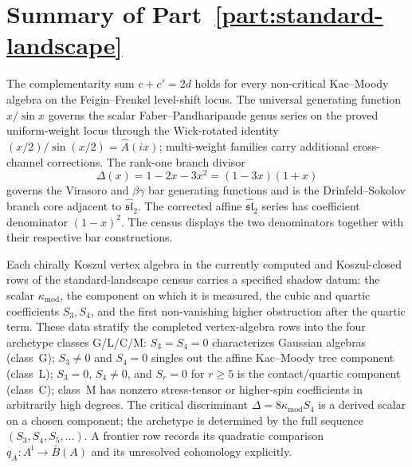 \chapter*{Summary of Part~\ref{part:standard-landscape}}
\label{ch:landscape-census}\label{chap:landscape-census}

\providecommand{\kappaChHodge}{\kappa^{\mathrm{Hodge}}_{\mathrm{ch}}}
\providecommand{\kappaBKM}{\kappa_{\mathrm{BKM}}}

The complementarity sum $c + c' = 2d$ holds for every non-critical
Kac--Moody algebra on the Feigin--Frenkel level-shift locus. The
universal generating function $x/\sin x$ governs the scalar
Faber--Pandharipande genus series on the proved uniform-weight locus
through the Wick-rotated identity
$(x/2)/\sin(x/2)=\widehat{A}(ix)$; multi-weight families carry
additional cross-channel corrections. The rank-one branch divisor
\[
\Delta(x) = 1 - 2x - 3x^2=(1-3x)(1+x)
\]
governs the Virasoro and $\beta\gamma$ bar generating functions and is
the Drinfeld--Sokolov branch core adjacent to
$\widehat{\mathfrak{sl}}_2$.  The corrected affine
$\widehat{\mathfrak{sl}}_2$ series has coefficient denominator
$(1-x)^2$.  The census displays the two denominators together with
their respective bar constructions.

Each chirally Koszul vertex algebra in the currently computed and
Koszul-closed rows of the standard-landscape census carries a specified
shadow datum: the scalar $\kappa_{\mathrm{mod}}$, the component on which it is measured,
the cubic and quartic coefficients $S_3,S_4$, and the first
non-vanishing higher obstruction after the quartic term. These data
stratify the completed vertex-algebra rows into the four archetype
classes G/L/C/M: $S_3=S_4=0$ characterizes Gaussian algebras
(class~G); $S_3\ne0$ and $S_4=0$ singles out the affine
Kac--Moody tree component (class~L); $S_3=0$, $S_4\ne0$, and
$S_r=0$ for $r\ge5$ is the contact/quartic component
(class~C); class~M has nonzero stress-tensor or higher-spin
coefficients in arbitrarily high degrees.  The critical discriminant
$\Delta=8\kappa_{\mathrm{mod}} S_4$ is a derived scalar on a chosen component; the
archetype is determined by the full sequence
\((S_3,S_4,S_5,\ldots)\).  A frontier row records its quadratic
comparison \(q_A:A^{\mathrm i}\to\bar B(A)\) and its unresolved
cohomology explicitly.

